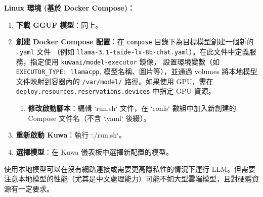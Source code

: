 \documentclass[twocolumn,11pt,a4paper]{article}
\begin{document}
\textbf{Linux 環境 (基於 Docker Compose)：}
\begin{enumerate}[noitemsep, topsep=0pt]
    \item \textbf{下載 GGUF 模型}：同上。
    \item \textbf{創建 Docker Compose 配置}：在 \texttt{compose} 目錄下為目標模型創建一個新的 \texttt{.yaml} 文件
    （例如 \texttt{llama-3.1-taide-lx-8b-chat.yaml}）。在此文件中定義服務，指定使用 \texttt{kuwaai/model-executor} 鏡像，
    設置環境變數（如 \texttt{EXECUTOR\_TYPE: llamacpp}, 模型名稱、圖片等），並通過 volumes 將本地模型文件映射到容器內的 \texttt{/var/model/}
     路徑。如果使用 GPU，需在 \texttt{deploy.resources.reservations.devices} 中指定 GPU 資源。
    \begin{enumerate}[noitemsep, topsep=0pt]
        \item \textbf{修改啟動腳本}：編輯 `run.sh` 文件，在 `confs` 數組中加入新創建的 Compose 文件名（不含 `.yaml` 後綴）。
    \end{enumerate}
    \item \textbf{重新啟動 Kuwa}：執行 `./run.sh`。
    \item \textbf{選擇模型}：在 Kuwa 儀表板中選擇新配置的模型。
\end{enumerate}
使用本地模型可以在沒有網路連接或需要更高隱私性的情況下運行 LLM。但需要注意本地模型的性能（尤其是中文處理能力）可能不如大型雲端模型，且對硬體資源有一定要求。
\end{document}
